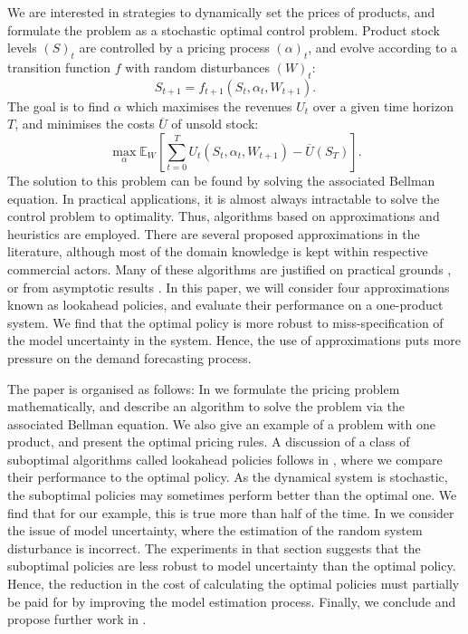 \documentclass[main.tex]{subfiles}
\begin{document}
We are interested in strategies to dynamically set the prices of products, and
formulate the problem as a stochastic optimal control problem.
Product stock levels ${(S)}_t$ are controlled by a pricing process
${(\alpha)}_t$, and evolve according to a transition function $f$ with random disturbances
${(W)}_t$:
\begin{equation}
  S_{t+1}=f_{t+1}(S_t,\alpha_t,W_{t+1}).
\end{equation}
The goal is to find $\alpha$ which maximises the revenues $U_t$ over a
given time horizon $T$, and
minimises the costs $\overline{U}$ of unsold stock:
\begin{equation}
  \max_{\alpha}\mathbb E_W\left[ \sum_{t=0}^TU_t(S_t,\alpha_t,W_{t+1})
    - \overline{U}(S_T)\right].
\end{equation}
The solution to this problem can be found by solving the associated
Bellman equation. In practical applications, it is almost always
intractable to solve the control problem to optimality.
Thus, algorithms based on approximations and heuristics are employed.
There are several proposed approximations in the
literature, although most of the domain knowledge is kept within
respective commercial actors.
Many of these algorithms are justified on practical grounds
\citep{aviv2012dynamic}, or
from asymptotic results \citep{gallego1994optimal}.
In this paper, we will consider four approximations known as
lookahead policies,
and evaluate their performance on a one-product system.
We find that the optimal policy is more robust to
miss-specification of the model uncertainty in the system.
Hence, the use of approximations puts more pressure on the
demand forecasting process.

The paper is organised as follows:
In  we formulate the
pricing problem mathematically, and describe an algorithm to solve the
problem via the associated Bellman equation. We also give an example
of a problem with one product, and present the optimal pricing rules.
A discussion of a class of suboptimal
algorithms called lookahead policies follows in
, where we compare their performance to
the optimal policy. As the dynamical system is stochastic, the
suboptimal policies may sometimes perform better than the optimal
one. We find that for our example, this is  true more than half of
the time.
In  we consider the issue of
model uncertainty, where the estimation of the random system
disturbance is incorrect. The experiments in that section suggests
that the suboptimal policies are less robust to model uncertainty
than the optimal policy. Hence, the reduction in the cost
of calculating the optimal policies must partially be paid for
by improving the model estimation process.
Finally, we conclude and propose further work in .

\biblio
\end{document}
